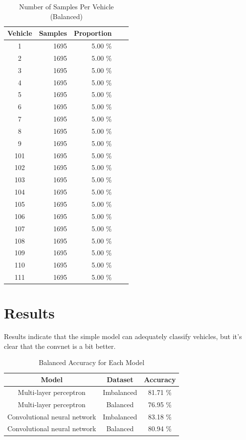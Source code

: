 \documentclass[10pt]{article}
\newcommand{\newpar}{\medskip \noindent}
\begin{document}
\begin{table}
    \caption*{Number of Samples Per Vehicle (Balanced)}
    \centering
    \begin{tabular}{|c|r|r|r|r|}
    \hline
    \textbf{Vehicle} & \textbf{Samples} & \textbf{Proportion} \\
    \hline
    1   & 1695 & 5.00 \% \\
    2   & 1695 & 5.00 \% \\
    3   & 1695 & 5.00 \% \\
    4   & 1695 & 5.00 \% \\
    5   & 1695 & 5.00 \% \\
    6   & 1695 & 5.00 \% \\
    7   & 1695 & 5.00 \% \\
    8   & 1695 & 5.00 \% \\
    9   & 1695 & 5.00 \% \\
    101 & 1695 & 5.00 \% \\
    102 & 1695 & 5.00 \% \\
    103 & 1695 & 5.00 \% \\
    104 & 1695 & 5.00 \% \\
    105 & 1695 & 5.00 \% \\
    106 & 1695 & 5.00 \% \\
    107 & 1695 & 5.00 \% \\
    108 & 1695 & 5.00 \% \\
    109 & 1695 & 5.00 \% \\
    110 & 1695 & 5.00 \% \\
    111 & 1695 & 5.00 \% \\
    \hline
    \end{tabular}
\end{table}

\section{Results}


\newpar Results indicate that the simple model can adequately classify vehicles, but it's clear that the convnet is a bit better.

\begin{table}
    \caption*{Balanced Accuracy for Each Model}
    \centering
    \begin{tabular}{|c|c|c|}
    \hline
    \textbf{Model} & \textbf{Dataset} & \textbf{Accuracy} \\
    \hline
    Multi-layer perceptron       & Imbalanced & 81.71 \% \\
    Multi-layer perceptron       & Balanced   & 76.95 \% \\
    Convolutional neural network & Imbalanced & 83.18 \% \\
    Convolutional neural network & Balanced   & 80.94 \% \\
    \hline
    \end{tabular}
\end{table}
\end{document}
